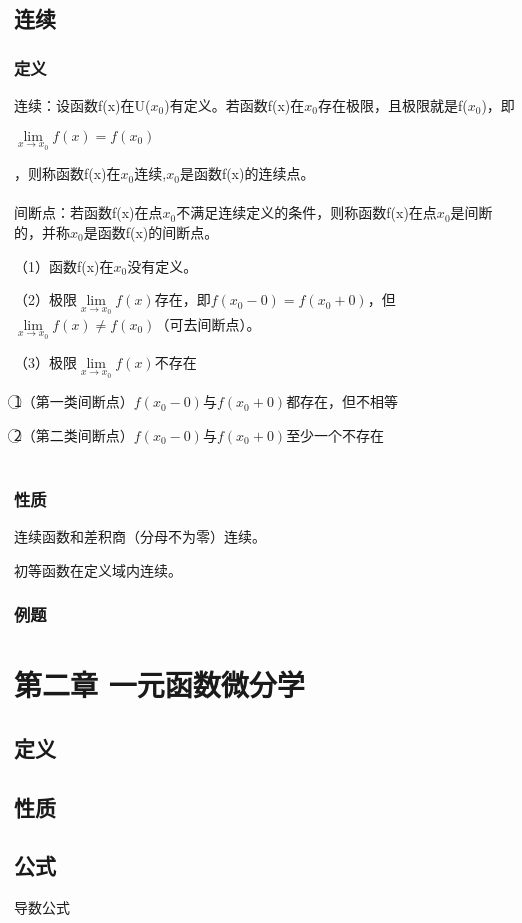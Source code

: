 \documentclass{ctexart}
\begin{document}
\subsection{连续}
\subsubsection{定义}
连续：设函数f(x)在U($x_0$)有定义。若函数f(x)在$x_0$存在极限，且极限就是f($x_0$)，即
\begin{center}
$\lim\limits_{x \rightarrow x_0}f(x)=f(x_0)$
\end{center}
，则称函数f(x)在$x_0$连续,$x_0$是函数f(x)的连续点。
\\\\

间断点：若函数f(x)在点$x_0$不满足连续定义的条件，则称函数f(x)在点$x_0$是间断的，并称$x_0$是函数f(x)的间断点。

（1）函数f(x)在$x_0$没有定义。

（2）极限$\lim\limits_{x \rightarrow x_0}f(x)$存在，即$f(x_0-0)=f(x_0+0)$，但$\lim\limits_{x \rightarrow x_0}f(x) \neq f(x_0)$（可去间断点）。

（3）极限$\lim\limits_{x \rightarrow x_0}f(x)$不存在

\textcircled{1}（第一类间断点）$f(x_0-0)$与$f(x_0+0)$都存在，但不相等

\textcircled{2}（第二类间断点）$f(x_0-0)$与$f(x_0+0)$至少一个不存在
\\\\
\subsubsection{性质}
连续函数和差积商（分母不为零）连续。

初等函数在定义域内连续。
\subsubsection{例题}

\section{第二章 一元函数微分学}
\subsection{定义}
\subsection{性质}
\subsection{公式}
导数公式
\end{document}
